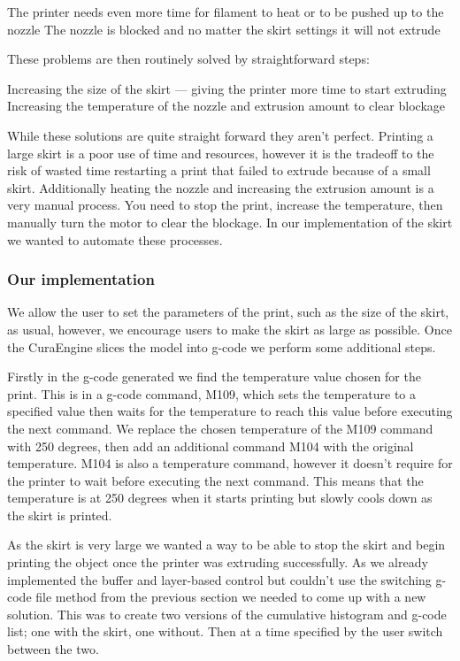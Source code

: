 \documentclass[pdftex, 11pt]{report} %
\begin{document}
The printer needs even more time for filament to heat or to be pushed up to the nozzle
The nozzle is blocked and no matter the skirt settings it will not extrude 

These problems are then routinely solved by straightforward steps:

Increasing the size of the skirt --- giving the printer more time to start extruding
Increasing the temperature of the nozzle and extrusion amount to clear blockage

While these solutions are quite straight forward they aren't perfect. Printing a large skirt is a poor use of time and resources, however it is the tradeoff to the risk of wasted time restarting a print that failed to extrude because of a small skirt. Additionally heating the nozzle and increasing the extrusion amount is a very manual process. You need to stop the print, increase the temperature, then manually turn the motor to clear the blockage. In our implementation of the skirt we wanted to automate these processes.

\subsubsection{Our implementation}
We allow the user to set the parameters of the print, such as the size of the skirt, as usual, however, we encourage users to make the skirt as large as possible. Once the CuraEngine slices the model into g-code we perform some additional steps. 

Firstly in the g-code generated we find the temperature value chosen for the print. This is in a g-code command, M109, which sets the temperature to a specified value then waits for the temperature to reach this value before executing the next command. We replace the chosen temperature of the M109 command with 250 degrees, then add an additional command M104 with the original temperature. M104 is also a temperature command, however it doesn't require for the printer to wait before executing the next command. This means that the temperature is at 250 degrees when it starts printing but slowly cools down as the skirt is printed. 

As the skirt is very large we wanted a way to be able to stop the skirt and begin printing the object once the printer was extruding successfully. As we already implemented the buffer and layer-based control but couldn't use the switching g-code file method from the previous section we needed to come up with a new solution. This was to create two versions of the cumulative histogram and g-code list; one with the skirt, one without. Then at a time specified by the user switch between the two. 
\end{document}

